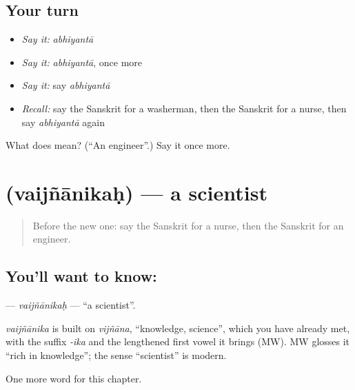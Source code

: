 \subsection*{Your turn}
\begin{itemize}
\raggedright
  \item \emph{Say it:} \emph{abhiyantā}
  \item \emph{Say it:} \emph{abhiyantā}, once more
  \item \emph{Say it:} say \emph{abhiyantā}
  \item \emph{Recall:} say the Sanskrit for a washerman, then the Sanskrit for a nurse, then say \emph{abhiyantā} again
\end{itemize}

\begin{tcolorbox}[breakable,colback=teal!4,colframe=teal!35!black,title={Before you move on}]
What does  mean? (\textquotedblleft{}An engineer\textquotedblright{}.) Say it once more.
\end{tcolorbox}
\section[\texorpdfstring{\sk{वैज्ञानिकः} (vaijñānikaḥ)}{वैज्ञानिकः (vaijñānikaḥ)}]{ (vaijñānikaḥ) — a scientist}

\label{lesson:SA-C238-vaijnanikah}



\begin{quote}
Before the new one: say the Sanskrit for a nurse, then the Sanskrit for an engineer.
\end{quote}

\subsection*{You'll want to know: }
\textbf{} — \emph{vaijñānikaḥ} — \textquotedblleft{}a scientist\textquotedblright{}.

\begin{cousinweb}
\emph{vaijñānika} is built on \emph{vijñāna}, \textquotedblleft{}knowledge, science\textquotedblright{}, which you have already met, with the suffix \emph{-ika} and the lengthened first vowel it brings (MW). MW glosses it \textquotedblleft{}rich in knowledge\textquotedblright{}; the sense \textquotedblleft{}scientist\textquotedblright{} is modern.
\end{cousinweb}

\begin{grammarlens}[title={What you've built}]
One more word for this chapter.
\end{grammarlens}

